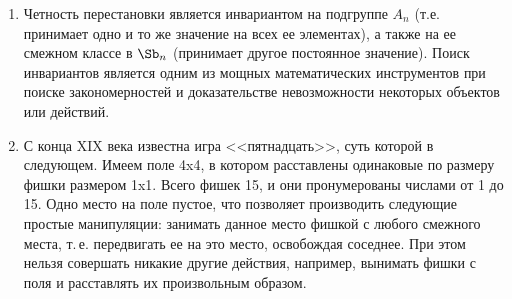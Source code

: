 \begin{enumerate}
\begin{table}[h!]
\begin{tabular}{c||c}
\footnotesize %
\begin{tabular}{cc|cc}
 $\id$    & (12)(34) & (13)(24) & (14)(23) \\[5pt]
 (12)(34) & $\id$    & (14)(23) & (13)(24) \\[3pt]\hline
 &&& \\[-5pt]
 (13)(24) & (14)(23) & $\id$    & (12)(34) \\[5pt]
 (14)(23) & (13)(24) & (12)(34) & $\id$
\end{tabular}
 &
\begin{tabular}{c|cccc}
$\sqrt[4]{1}$ & 1    & $i$  & $-1$ & $-i$ \\  \hline
1             & 1    & $i$  & $-1$ & $-i$ \\
$i$           & $i$  & $-1$ & $-i$ & 1    \\
$-1$          & $-1$ & $-i$ & 1    & $i$  \\
$-i$          & $-i$ & 1    & $i$  & $-1$
\end{tabular}
\\
\\

\hline

\end{tabular}
\caption{}\label{vier}
\end{table}

Отметим, что с точностью до изоморфизма существует всего две группы 4-го порядка: группа Клейна и циклическая группа. Несмотря на все разнообразие их представителей!




\subsection*{Игра <<Пятнадцать>>}


\item Четность перестановки является инвариантом на подгруппе $A_n$ (т.е. принимает одно и то же значение на всех ее элементах), а также на ее смежном классе в $\Sb_n$ (принимает другое постоянное значение). Поиск инвариантов является одним из мощных математических инструментов при поиске закономерностей и доказательстве невозможности некоторых объектов или действий.

\item С конца XIX века известна игра <<пятнадцать>>, суть которой в следующем. Имеем поле 4x4, в котором расставлены одинаковые по размеру фишки размером 1x1. Всего фишек 15, и они пронумерованы числами от 1 до 15. Одно место на поле пустое, что позволяет производить следующие простые манипуляции: занимать данное место фишкой с любого смежного места, т.\,е. передвигать ее на это место, освобождая соседнее.
При этом нельзя совершать никакие другие действия, например, вынимать фишки с поля и расставлять их произвольным образом.


\end{enumerate}
